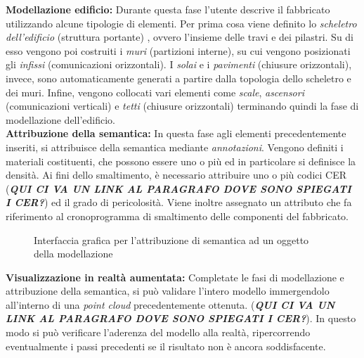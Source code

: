 \noindent \textbf{Modellazione edificio:} Durante questa fase l'utente descrive il fabbricato utilizzando alcune tipologie di elementi. Per prima cosa viene definito lo \textit{scheletro dell'edificio} (struttura portante) , ovvero l'insieme delle travi e dei pilastri. Su di esso vengono poi costruiti i \textit{muri} (partizioni interne), su cui vengono posizionati gli \textit{infissi} (comunicazioni orizzontali). I \textit{solai} e i \textit{pavimenti} (chiusure orizzontali), invece, sono automaticamente generati a partire dalla topologia dello scheletro e dei muri. Infine, vengono collocati vari elementi come \textit{scale}, \textit{ascensori} (comunicazioni verticali) e \textit{tetti} (chiusure orizzontali) terminando quindi la fase di modellazione dell'edificio.\\

\noindent \textbf{Attribuzione della semantica:} In questa fase agli elementi precedentemente inseriti, si attribuisce della semantica mediante \textit{annotazioni}. Vengono definiti i materiali costituenti, che possono essere uno o pi\`u ed in particolare si definisce la densit\`a. Ai fini dello smaltimento, \`e necessario attribuire uno o pi\`u codici CER (\textbf{\textit{QUI CI VA UN LINK AL PARAGRAFO DOVE SONO SPIEGATI I CER?}}) ed il grado di pericolosit\`a. Viene inoltre assegnato un attributo che fa riferimento al cronoprogramma di smaltimento delle componenti del fabbricato.\\

\begin{figure}[!h]
  \centering
   {}
  \caption{Interfaccia grafica per l'attribuzione di semantica ad un oggetto della modellazione}
  \label{fig:example1}
\end{figure}

\noindent \textbf{Visualizzazione in realt\`a aumentata:} Completate le fasi di modellazione e attribuzione della semantica, si pu\`o validare l'intero modello immergendolo all'interno di una \textit{point cloud} precedentemente ottenuta. (\textbf{\textit{QUI CI VA UN LINK AL PARAGRAFO DOVE SONO SPIEGATI I CER?}}). In questo modo si pu\`o verificare l'aderenza del modello alla realt\`a, ripercorrendo eventualmente i passi precedenti se il risultato non \`e ancora soddisfacente.\\

